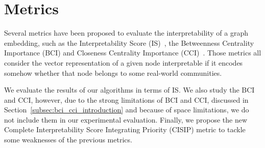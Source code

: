 \section{Metrics}\label{sec:metrics}
Several metrics have been proposed to evaluate the interpretability of a graph embedding, such as the Interpretability Score (IS)~\cite{gogoglou_2019}, the Betweenness Centrality Importance (BCI) and Closeness Centrality Importance (CCI)~\cite{khoshraftar2021}. Those metrics all consider the vector representation of a given node interpretable if it encodes somehow whether that node belongs to some real-world communities. 

We evaluate the results of our algorithms in terms of IS.  We also study the BCI and CCI, however, due to the strong limitations of BCI and CCI, discussed in Section~\ref{subsec:bci_cci_introduction} and because of space limitations, we do not include them in our experimental evaluation. Finally, we propose the new Complete Interpretability Score Integrating Priority (CISIP) metric to tackle some weaknesses of the previous metrics.



